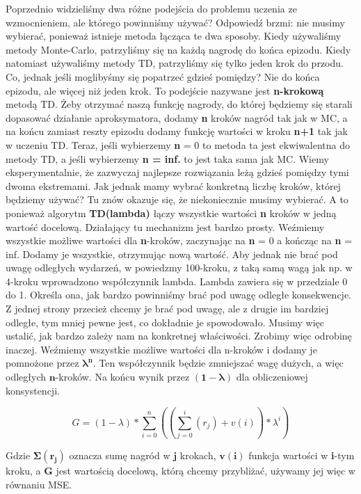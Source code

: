 Poprzednio widzieliśmy dwa różne podejścia do problemu uczenia ze wzmocnieniem, ale którego powinniśmy używać? Odpowiedź brzmi: nie musimy wybierać, ponieważ istnieje metoda łącząca te dwa sposoby. Kiedy używaliśmy metody Monte-Carlo, patrzyliśmy się na każdą nagrodę do końca epizodu. Kiedy natomiast używaliśmy metody TD, patrzyliśmy się tylko jeden krok do przodu. Co, jednak jeśli moglibyśmy się popatrzeć gdzieś pomiędzy? Nie do końca epizodu, ale więcej niż jeden krok. To podejście nazywane jest \textbf{n-krokową} metodą TD. Żeby otrzymać naszą funkcję nagrody, do której będziemy się starali dopasować działanie aproksymatora, dodamy \textbf{n} kroków nagród tak jak w MC, a na końcu zamiast reszty epizodu dodamy funkcję wartości w kroku \textbf{n+1} tak jak w uczeniu TD. Teraz, jeśli wybierzemy \textbf{n} = 0 to metoda ta jest ekwiwalentna do metody TD, a jeśli wybierzemy \textbf{n = inf.} to jest taka sama jak MC. Wiemy eksperymentalnie, że zazwyczaj najlepsze rozwiązania leżą gdzieś pomiędzy tymi dwoma ekstremami. Jak jednak mamy wybrać konkretną liczbę kroków, której będziemy używać? Tu znów okazuje się, że niekoniecznie musimy wybierać. A to ponieważ algorytm \textbf{TD(lambda)} łączy wszystkie wartości \textbf{n} kroków w jedną wartość docelową. Działający tu mechanizm jest bardzo prosty. Weźmiemy wszystkie możliwe wartości dla \textbf{n}-kroków, zaczynając na \textbf{n} = 0 a kończąc na \textbf{n} = inf. Dodamy je wszystkie, otrzymując nową wartość. Aby jednak nie brać pod uwagę odległych wydarzeń, w powiedzmy 100-kroku, z taką samą wagą jak np. w 4-kroku wprowadzono współczynnik lambda. Lambda zawiera się w przedziale 0 do 1. Określa ona, jak bardzo powinniśmy brać pod uwagę odległe konsekwencje. Z jednej strony przecież chcemy je brać pod uwagę, ale z drugie im bardziej odległe, tym mniej pewne jest, co dokładnie je spowodowało. Musimy więc ustalić, jak bardzo zależy nam na konkretnej właściwości. Zrobimy więc odrobinę inaczej. Weźmiemy wszystkie możliwe wartości dla n-kroków i dodamy je pomnożone przez $\boldsymbol{\lambda^n}$. Ten współczynnik będzie zmniejszać wagę dużych, a więc odległych $\boldsymbol{n}$-kroków. Na końcu wynik przez $\boldsymbol{(1 - \lambda)}$ dla obliczeniowej konsystencji.

\begin{equation}
G = (1 - \lambda) * \sum_{i = 0}^{n}((\sum_{j = 0}^{i}(r_j) + v(i)) * \lambda^i)
\end{equation}

\noindent Gdzie $\boldsymbol{\Sigma(r_j)}$ oznacza sumę nagród w $\boldsymbol{j}$ krokach, $\boldsymbol{v(i)}$ funkcja wartości w \textbf{i}-tym kroku, a $\boldsymbol{G}$ jest wartością docelową, którą chcemy przybliżać, używamy jej więc w równaniu MSE.\newline


